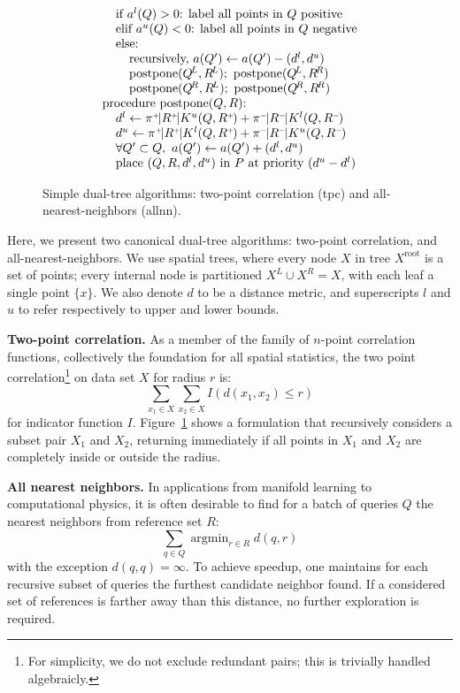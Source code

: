 \documentclass{article}
\DeclareMathOperator*{\argmin}{argmin}
\newcommand{\fig}[1]{Figure~\ref{fig:#1}}
\newcommand{\spos}{^{{\scriptscriptstyle +\!}}}
\newcommand{\sneg}{^{{\scriptscriptstyle -\!}}}
\newcommand{\kdroot}[1]{#1^{\!\text{root}}}
\newcommand{\kdleft}[1]{#1^{\!L}}
\newcommand{\kdright}[1]{#1^{\!R}}
\newcommand{\al}{a^l}
\newcommand{\au}{a^u}
\newcommand{\dl}{d^l}
\newcommand{\du}{d^u}
\newcommand{\x}{\\ \hspace{0.15in}}
\newcommand{\xx}{\\ \hspace{0.3in}}
\begin{document}
\begin{figure}
\begin{displaymath}
\begin{array}{ll}
\begin{array}{l}
        \x \text{if }\al(Q) > 0\text{: label all points in }Q\text{ positive}
        \x \text{elif }\au(Q) < 0\text{: label all points in }Q\text{ negative}
        \x \text{else:}
        \xx \text{recursively, }a(Q') \gets a(Q') - (\dl, \du)
        \xx \text{postpone}(\kdleft{Q}, \kdleft{R}); \text{ postpone}(\kdleft{Q}, \kdright{R})
        \xx \text{postpone}(\kdright{Q}, \kdleft{R}); \text{ postpone}(\kdright{Q}, \kdright{R})
        \\ \text{procedure postpone}(Q, R)\text{:}
        \x \dl \gets \pi\spos|R\spos|K^{u}(Q, R\spos) + \pi\sneg|R\sneg|K^{l}(Q, R\sneg)
        \x \du \gets \pi\spos|R\spos|K^{l}(Q, R\spos) + \pi\sneg|R\sneg|K^{u}(Q, R\sneg)
        \x \forall Q' \subset Q,~ a(Q') \gets a(Q') + (\dl, \du)
        \x \text{place }(Q, R, \dl, \du)\text{ in }P\text{ at priority }(\du-\dl)
      \end{array}
    \end{array}
  \end{displaymath}
  \label{fig:allnntpc}
  \caption{Simple dual-tree algorithms: two-point correlation (tpc) and all-nearest-neighbors (allnn).}
\end{figure}

Here, we present two canonical dual-tree algorithms: two-point correlation, and all-nearest-neighbors.
We use spatial trees, where every node $X$ in tree $\kdroot{X}$ is a set of points; every internal node is partitioned $\kdleft{X} \cup \kdright{X} = X$, with each leaf a single point $\{x\}$.
We also denote $d$ to be a distance metric, and superscripts $l$ and $u$ to refer respectively to upper and lower bounds.

{\bf Two-point correlation.} As a member of the family of $n$-point correlation functions, collectively the foundation for all spatial statistics, the two point correlation\footnote{For simplicity, we do not exclude redundant pairs; this is trivially handled algebraicly.} on data set $X$ for radius $r$ is:
\begin{equation*}
\sum_{x_1 \in X} \sum_{x_2 \in X} I(d(x_1, x_2) \leq r)
\end{equation*}
\noindent for indicator function $I$.
\fig{allnntpc} shows a formulation that recursively considers a subset pair $X_1$ and $X_2$, returning immediately if all points in $X_1$ and $X_2$ are completely inside or outside the radius.

{\bf All nearest neighbors.} In applications from manifold learning to computational physics, it is often desirable to find for a batch of queries $Q$ the nearest neighbors from reference set $R$:
\begin{equation*}
\sum_{q \in Q} \argmin_{r \in R} d(q,r)
\end{equation*}
\noindent with the exception $d(q,q) = \infty$.
To achieve speedup, one maintains for each recursive subset of queries the furthest candidate neighbor found.
If a considered set of references is farther away than this distance, no further exploration is required.
\end{document}
